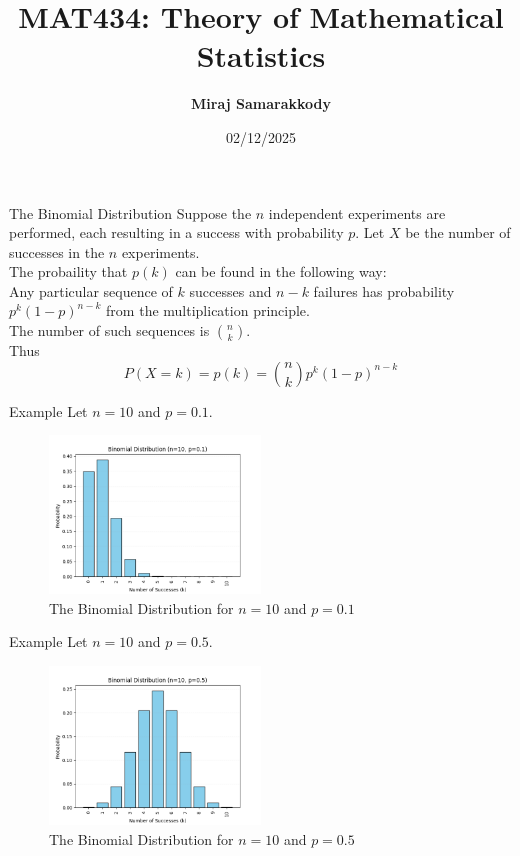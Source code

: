\documentclass{beamer}
\title{MAT434: Theory of Mathematical Statistics}
\author{\textbf{Miraj Samarakkody}}
\institute{Tougaloo College}
\date{02/12/2025}
\begin{document}
\begin{frame}
    \titlepage
\end{frame}

\begin{frame}{The Binomial Distribution}
    Suppose the \(n\) independent experiments are performed, each resulting in a success with probability \(p\). Let \(X\) be the number of successes in the \(n\) experiments.\\
    \vspace{0.1in}
    \pause
    The probaility that \(p(k)\) can be found in the following way:\\
    \vspace{0.1in}\pause
    Any particular sequence of \(k\) successes and \(n-k\) failures has probability \(p^k(1-p)^{n-k}\) from the multiplication principle. \\
    \pause
    \vspace{0.1in}
    The number of such sequences is \(\binom{n}{k}\).\\\pause
    \vspace{0.1in}
    Thus \[
    P(X=k)=p(k)=\binom{n}{k}p^k(1-p)^{n-k}
    \]

\end{frame}

\begin{frame}{Example}
    Let \(n=10\) and \(p=0.1\). \pause
    \begin{figure}
        \centering
        \includegraphics[width=0.5\textwidth]{Figures/Figure_1.png}
        \caption{The Binomial Distribution for \(n=10\) and \(p=0.1\)}
        \label{fig:binomial}
    \end{figure}
\end{frame}

\begin{frame}{Example}
    Let \(n=10\) and \(p=0.5\). \pause
    \begin{figure}
        \centering
        \includegraphics[width=0.5\textwidth]{Figures/Figure_2.png}
        \caption{The Binomial Distribution for \(n=10\) and \(p=0.5\)}
        \label{fig:binomial}
    \end{figure}
\end{frame}
\end{document}
